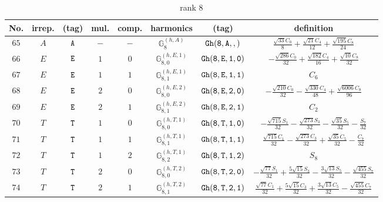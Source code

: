 \documentclass[fleqn,8pt]{jsarticle}
\begin{document}
\begin{table}[ht!]
\begin{center}
\caption{rank 8}
\renewcommand{\arraystretch}{1.3}
\begin{tabular}{cccccccc} \hline \hline
No. & irrep. & (tag) & mul. & comp. & harmonics & (tag) & definition \\ \hline
$ 65 $ & $ A $ & $ {\tt A} $ & $ - $ & $ - $ & $ \mathbb{G}_{8}^{(h,A)} $ & $ {\tt Gh(8,A,,)} $ & $ \frac{\sqrt{33} C_{0}}{8} + \frac{\sqrt{21} C_{4}}{12} + \frac{\sqrt{195} C_{8}}{24} $ \\
$ 66 $ & $ E $ & $ {\tt E} $ & $ 1 $ & $ 0 $ & $ \mathbb{G}_{8,0}^{(h,E,1)} $ & $ {\tt Gh(8,E,1,0)} $ & $ - \frac{\sqrt{286} C_{0}}{32} + \frac{\sqrt{182} C_{4}}{16} + \frac{\sqrt{10} C_{8}}{32} $ \\
$ 67 $ & $ E $ & $ {\tt E} $ & $ 1 $ & $ 1 $ & $ \mathbb{G}_{8,1}^{(h,E,1)} $ & $ {\tt Gh(8,E,1,1)} $ & $ C_{6} $ \\
$ 68 $ & $ E $ & $ {\tt E} $ & $ 2 $ & $ 0 $ & $ \mathbb{G}_{8,0}^{(h,E,2)} $ & $ {\tt Gh(8,E,2,0)} $ & $ - \frac{\sqrt{210} C_{0}}{32} - \frac{\sqrt{330} C_{4}}{48} + \frac{\sqrt{6006} C_{8}}{96} $ \\
$ 69 $ & $ E $ & $ {\tt E} $ & $ 2 $ & $ 1 $ & $ \mathbb{G}_{8,1}^{(h,E,2)} $ & $ {\tt Gh(8,E,2,1)} $ & $ C_{2} $ \\
$ 70 $ & $ T $ & $ {\tt T} $ & $ 1 $ & $ 0 $ & $ \mathbb{G}_{8,0}^{(h,T,1)} $ & $ {\tt Gh(8,T,1,0)} $ & $ - \frac{\sqrt{715} S_{1}}{32} - \frac{\sqrt{273} S_{3}}{32} - \frac{\sqrt{35} S_{5}}{32} - \frac{S_{7}}{32} $ \\
$ 71 $ & $ T $ & $ {\tt T} $ & $ 1 $ & $ 1 $ & $ \mathbb{G}_{8,1}^{(h,T,1)} $ & $ {\tt Gh(8,T,1,1)} $ & $ \frac{\sqrt{715} C_{1}}{32} - \frac{\sqrt{273} C_{3}}{32} + \frac{\sqrt{35} C_{5}}{32} - \frac{C_{7}}{32} $ \\
$ 72 $ & $ T $ & $ {\tt T} $ & $ 1 $ & $ 2 $ & $ \mathbb{G}_{8,2}^{(h,T,1)} $ & $ {\tt Gh(8,T,1,2)} $ & $ S_{8} $ \\
$ 73 $ & $ T $ & $ {\tt T} $ & $ 2 $ & $ 0 $ & $ \mathbb{G}_{8,0}^{(h,T,2)} $ & $ {\tt Gh(8,T,2,0)} $ & $ - \frac{\sqrt{77} S_{1}}{32} + \frac{5 \sqrt{15} S_{3}}{32} - \frac{3 \sqrt{13} S_{5}}{32} - \frac{\sqrt{455} S_{7}}{32} $ \\
$ 74 $ & $ T $ & $ {\tt T} $ & $ 2 $ & $ 1 $ & $ \mathbb{G}_{8,1}^{(h,T,2)} $ & $ {\tt Gh(8,T,2,1)} $ & $ \frac{\sqrt{77} C_{1}}{32} + \frac{5 \sqrt{15} C_{3}}{32} + \frac{3 \sqrt{13} C_{5}}{32} - \frac{\sqrt{455} C_{7}}{32} $ \\

\end{tabular}
\end{center}
\end{table}
\end{document}
